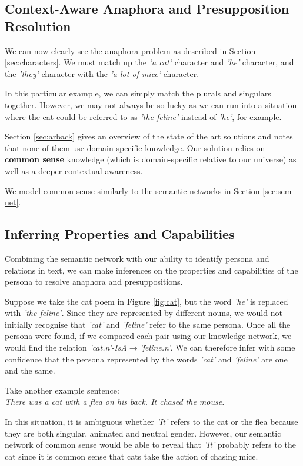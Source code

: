 \subsection{Context-Aware Anaphora and Presupposition Resolution}
\label{sec:ca-ar}
We can now clearly see the anaphora problem as described in Section \ref{sec:characters}. We must match up the \textit{'a cat'} character and \textit{'he'} character, and the \textit{'they'} character with the \textit{'a lot of mice'} character. 

In this particular example, we can simply match the plurals and singulars together. However, we may not always be so lucky as we can run into a situation where the cat could be referred to as \textit{'the feline'} instead of \textit{'he'}, for example.

Section \ref{sec:arback} gives an overview of the state of the art solutions and notes that none of them use domain-specific knowledge. Our solution relies on \textbf{common sense} knowledge (which is domain-specific relative to our universe) as well as a deeper contextual awareness.

We model common sense similarly to the semantic networks in Section \ref{sec:sem-net}.  


\subsection{Inferring Properties and Capabilities}

Combining the semantic network with our ability to identify persona and relations in text, we can make inferences on the properties and capabilities of the persona to resolve anaphora and presuppositions.

Suppose we take the cat poem in Figure \ref{fig:cat}, but the word \textit{'he'} is replaced with \textit{'the feline'}. Since they are represented by different nouns, we would not initially recognise that \textit{'cat'} and \textit{'feline'} refer to the same persona. Once all the persona were found, if we compared each pair using our knowledge network, we would find the relation \textit{'cat.n'-IsA$\rightarrow$'feline.n'}. We can therefore infer with some confidence that the persona represented by the words \textit{'cat'} and \textit{'feline'} are one and the same.

Take another example sentence:\\
\textit{There was a cat with a flea on his back. It chased the mouse.}

In this situation, it is ambiguous whether \textit{'It'} refers to the cat or the flea because they are both singular, animated and neutral gender. However, our semantic network of common sense would be able to reveal that \textit{'It'} probably refers to the cat since it is common sense that cats take the action of chasing mice.



